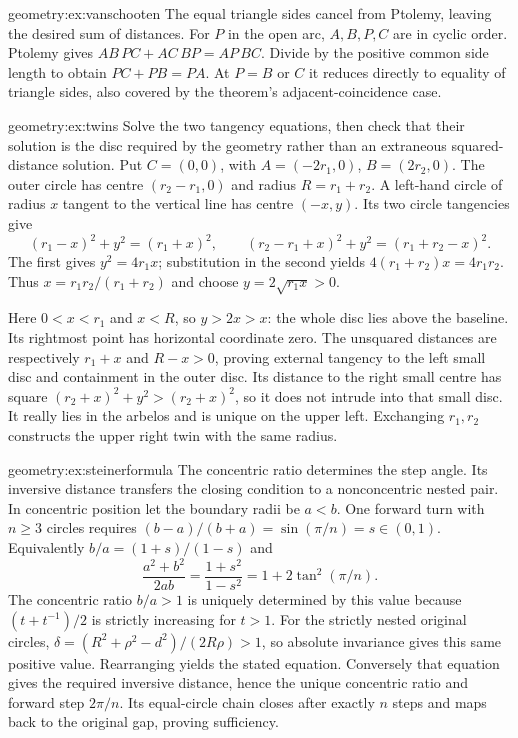 \begin{solution}{geometry:ex:vanschooten}
\idea The equal triangle sides cancel from Ptolemy, leaving the desired sum of distances.
\writeup For $P$ in the open arc, $A,B,P,C$ are in cyclic order. Ptolemy gives $AB\,PC+AC\,BP=AP\,BC$. Divide by the positive common side length to obtain $PC+PB=PA$. At $P=B$ or $C$ it reduces directly to equality of triangle sides, also covered by the theorem's adjacent-coincidence case.
\end{solution}

\begin{solution}{geometry:ex:twins}
\idea Solve the two tangency equations, then check that their solution is the disc required by the geometry rather than an extraneous squared-distance solution.
\writeup Put $C=(0,0)$, with $A=(-2r_1,0)$, $B=(2r_2,0)$. The outer circle has centre $(r_2-r_1,0)$ and radius $R=r_1+r_2$. A left-hand circle of radius $x$ tangent to the vertical line has centre $(-x,y)$. Its two circle tangencies give
\[
(r_1-x)^2+y^2=(r_1+x)^2,\qquad
(r_2-r_1+x)^2+y^2=(r_1+r_2-x)^2.
\]
The first gives $y^2=4r_1x$; substitution in the second yields $4(r_1+r_2)x=4r_1r_2$. Thus $x=r_1r_2/(r_1+r_2)$ and choose $y=2\sqrt{r_1x}>0$.

Here $0<x<r_1$ and $x<R$, so $y>2x>x$: the whole disc lies above the baseline. Its rightmost point has horizontal coordinate zero. The unsquared distances are respectively $r_1+x$ and $R-x>0$, proving external tangency to the left small disc and containment in the outer disc. Its distance to the right small centre has square $(r_2+x)^2+y^2>(r_2+x)^2$, so it does not intrude into that small disc. It really lies in the arbelos and is unique on the upper left. Exchanging $r_1,r_2$ constructs the upper right twin with the same radius.
\end{solution}

\begin{solution}{geometry:ex:steinerformula}
\idea The concentric ratio determines the step angle. Its inversive distance transfers the closing condition to a nonconcentric nested pair.
\writeup In concentric position let the boundary radii be $a<b$. One forward turn with $n\ge3$ circles requires
$(b-a)/(b+a)=\sin(\pi/n)=s\in(0,1)$. Equivalently $b/a=(1+s)/(1-s)$ and
\[
\frac{a^2+b^2}{2ab}
=\frac{1+s^2}{1-s^2}=1+2\tan^2(\pi/n).
\]
The concentric ratio $b/a>1$ is uniquely determined by this value because $(t+t^{-1})/2$ is strictly increasing for $t>1$. For the strictly nested original circles, $\delta=(R^2+\rho^2-d^2)/(2R\rho)>1$, so absolute invariance gives this same positive value. Rearranging yields the stated equation. Conversely that equation gives the required inversive distance, hence the unique concentric ratio and forward step $2\pi/n$. Its equal-circle chain closes after exactly $n$ steps and maps back to the original gap, proving sufficiency.
\end{solution}

